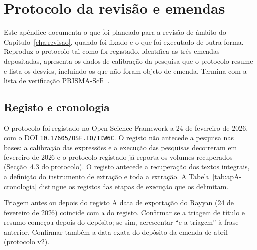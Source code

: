 \chapter{Protocolo da revisão e emendas}
\label{app:protocolo-sr}

Este apêndice documenta o que foi planeado para a revisão de âmbito do Capítulo~\ref{cha:revisao}, quando foi fixado e o que foi executado de outra forma. Reproduz o protocolo tal como foi registado, identifica as três emendas depositadas, apresenta os dados de calibração da pesquisa que o protocolo resume e lista os desvios, incluindo os que não foram objeto de emenda. Termina com a lista de verificação PRISMA-ScR~\cite{Tricco2018}.

\section{Registo e cronologia}
\label{sec:apA-cronologia}

O protocolo foi registado no Open Science Framework a 24 de fevereiro de 2026, com o DOI \nolinkurl{10.17605/OSF.IO/TDW6C}. O registo não antecede a pesquisa nas bases: a calibração das expressões e a execução das pesquisas decorreram em fevereiro de 2026 e o protocolo registado já reporta os volumes recuperados (Secção~4.3 do protocolo). O registo antecede a recuperação dos textos integrais, a definição do instrumento de extração e toda a extração. A Tabela~\ref{tab:apA-cronologia} distingue os registos das etapas de execução que os delimitam.

{Triagem antes ou depois do registo}
{A data de exportação do Rayyan (24 de fevereiro de 2026) coincide com a do registo. Confirmar se a triagem de título e resumo começou depois do depósito; se sim, acrescentar ``e a triagem'' à frase anterior. Confirmar também a data exata do depósito da emenda de abril (protocolo v2).}

